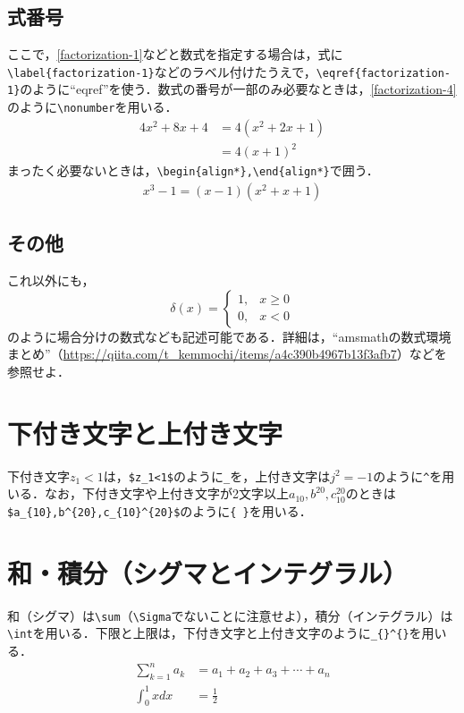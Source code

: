 \documentclass[11pt,a4paper]{jsarticle}
\begin{document}
\subsection{式番号}

ここで，\eqref{factorization-1}などと数式を指定する場合は，式に\verb|\label{factorization-1}|などのラベル付けたうえで，\verb|\eqref{factorization-1}|のように``eqref''を使う．数式の番号が一部のみ必要なときは，\eqref{factorization-4}のように\verb|\nonumber|を用いる．
\begin{align}\label{factorization-4}
  4x^2+8x+4 & =4\left(x^2+2x+1\right)\nonumber \\
            & =4(x+1)^2
\end{align}
まったく必要ないときは，\verb|\begin{align*},\end{align*}|で囲う．
\begin{align*}
  x^3-1=(x-1)\left(x^2+x+1\right)
\end{align*}

\subsection{その他}

これ以外にも，
\begin{equation*}
  \delta(x) =
  \begin{cases}
    1, & x \geq 0 \\
    0, & x < 0
  \end{cases}
\end{equation*}
のように場合分けの数式なども記述可能である．詳細は，``amsmathの数式環境まとめ''（\url{https://qiita.com/t_kemmochi/items/a4c390b4967b13f3afb7}）などを参照せよ．

\section{下付き文字と上付き文字}

下付き文字$z_1<1$は，\verb|$z_1<1$|のように\verb|_|を，上付き文字は$j^2=-1$のように\verb|^|を用いる．なお，下付き文字や上付き文字が2文字以上$a_{10},b^{20},c_{10}^{20}$のときは\verb|$a_{10},b^{20},c_{10}^{20}$|のように\verb|{ }|を用いる．

\section{和・積分（シグマとインテグラル）}

和（シグマ）は\verb|\sum|（\verb|\Sigma|でないことに注意せよ），積分（インテグラル）は\verb|\int|を用いる．下限と上限は，下付き文字と上付き文字のように\verb|_{}^{}|を用いる．
\begin{align*}
  \sum_{k=1}^{n}a_k & =a_1+a_2+a_3+\cdots+a_n \\
  \int_0^1 x dx     & = \frac{1}{2}
\end{align*}
\end{document}
